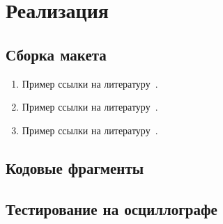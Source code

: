 \chapter{Реализация}
\section{Сборка макета}
\begin{enumerate}
\item Пример ссылки на литературу~\cite{wikiRUBitbucket}.
\item Пример ссылки на литературу~\cite{wikiRUIdSoftware}.
\item Пример ссылки на литературу~\cite{wikiRUGitHub}.
\end{enumerate}
\section{Кодовые фрагменты}

\section{Тестирование на осциллографе}
